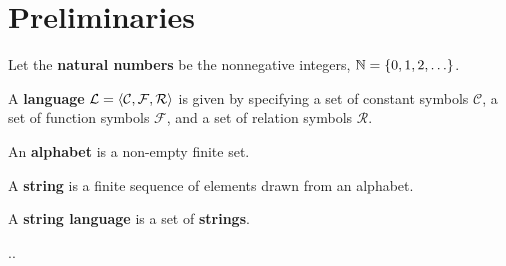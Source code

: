 \chapter{Preliminaries}\label{section:preliminaries}

\begin{notion}

Let the \textbf{natural numbers} be the nonnegative integers,
$\mathbb{N}=\left\{{0,1,2,\ldots}\right\}$.

\end{notion}

\begin{definition}

A \textbf{language} $\mathcal{L}=\left\langle{\mathcal{C},\mathcal{F}, \mathcal{R}}\right\rangle$
is given by specifying a set of constant symbols $\mathcal{C}$, a set of
function symbols $\mathcal{F}$, and a set of relation symbols $\mathcal{R}$.

\end{definition}


\begin{definition}

An \textbf{alphabet} is a non-empty finite set.

\end{definition}

\begin{definition}

A \textbf{string} is a finite sequence of elements drawn from an alphabet.

\end{definition}

\begin{definition}

A \textbf{string language} is a set of \textbf{strings}.

\end{definition}

..
